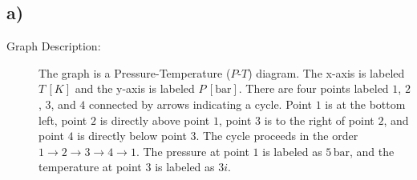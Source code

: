 

\subsection*{a)}

\begin{description}
    \item[Graph Description:] The graph is a Pressure-Temperature ($P$-$T$) diagram. The x-axis is labeled $T \, [K]$ and the y-axis is labeled $P \, [\text{bar}]$. There are four points labeled $1$, $2$, $3$, and $4$ connected by arrows indicating a cycle. Point $1$ is at the bottom left, point $2$ is directly above point $1$, point $3$ is to the right of point $2$, and point $4$ is directly below point $3$. The cycle proceeds in the order $1 \rightarrow 2 \rightarrow 3 \rightarrow 4 \rightarrow 1$. The pressure at point $1$ is labeled as $5 \, \text{bar}$, and the temperature at point $3$ is labeled as $3i$.
\end{description}